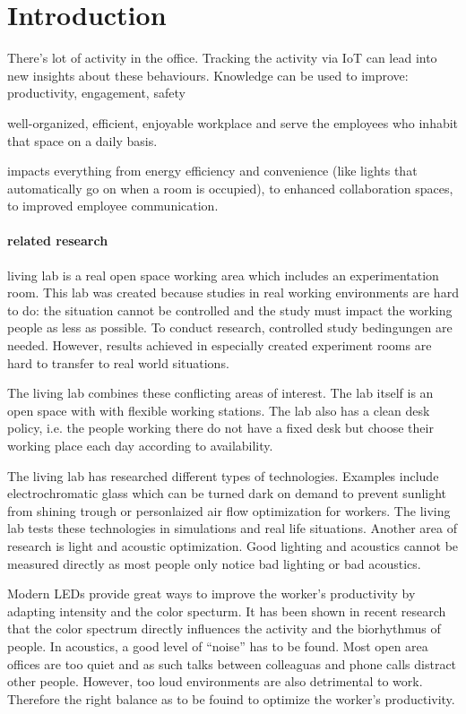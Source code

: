 \section{Introduction}
There's lot of activity in the office. Tracking the activity via IoT can lead into new insights about these behaviours. Knowledge can be used to improve: productivity, engagement, safety \cite{iotagenda}

well-organized, efficient, enjoyable workplace and serve the employees who inhabit that space on a daily basis.\cite{hbcommunications}

impacts everything from energy efficiency and convenience (like lights that automatically go on when a room is occupied), to enhanced
collaboration spaces, to improved employee communication. \cite{hbcommunications}

\paragraph{related research}
living lab is a real open space working area which includes an experimentation room. This lab was created because studies in real working environments are hard to do: the situation cannot be controlled and the study must impact the working people as less as possible. To conduct research, controlled study bedingungen are needed. However, results achieved in especially created experiment rooms are hard to transfer to real world situations. \cite{living-lab}

The living lab combines these conflicting areas of interest. The lab itself is an open space with with flexible working stations. The lab also has a clean desk policy, i.e. the people working there do not have a fixed desk but choose their working place each day according to availability.\cite{living-lab}

The living lab has researched different types of technologies. Examples include electrochromatic glass which can be turned dark on demand to prevent sunlight from shining trough or personlaized air flow optimization for workers. The living lab tests these technologies in simulations and real life situations. Another area of research is light and acoustic optimization. Good lighting and acoustics cannot be measured directly as most people only notice bad lighting or bad acoustics. \cite{living-lab}

Modern LEDs provide great ways to improve the worker's productivity by adapting intensity and the color specturm. It has been shown in recent research that the color spectrum directly influences the activity and the biorhythmus of people. In acoustics, a good level of ``noise'' has to be found. Most open area offices are too quiet and as such talks between colleaguas and phone calls distract other people. However, too loud environments are also detrimental to work. Therefore the right balance as to be fouind to optimize the worker's productivity.   
\cite{living-lab}

